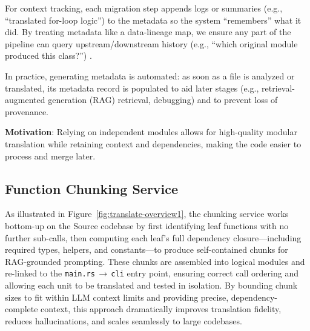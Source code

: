 \documentclass[twocolumn]{article}
\begin{document}
For context tracking, each migration step appends logs or summaries (e.g., ``translated for-loop logic'') to the metadata so the system ``remembers'' what it did. By treating metadata like a data-lineage map, we ensure any part of the pipeline can query upstream/downstream history (e.g., ``which original module produced this class?'') \cite{hu2024memserve} \cite{yao2024cacheblend}.

In practice, generating metadata is automated: as soon as a file is analyzed or translated, its metadata record is populated to aid later stages (e.g., retrieval-augmented generation (RAG) retrieval, debugging) and to prevent loss of provenance.

\textbf{Motivation}: Relying on independent modules allows for high-quality modular translation while retaining context and dependencies, making the code easier to process and merge later.

\subsection{Function Chunking Service}
\label{subsec:function_chunking}

As illustrated in Figure~\ref{fig:translate-overview1}, the chunking service works bottom-up on the Source codebase by first identifying leaf functions with no further sub-calls, then computing each leaf’s full dependency closure—including required types, helpers, and constants—to produce self-contained chunks for RAG-grounded prompting. These chunks are assembled into logical modules and re-linked to the \texttt{main.rs}\,$\to$\,\texttt{cli} entry point, ensuring correct call ordering and allowing each unit to be translated and tested in isolation. By bounding chunk sizes to fit within LLM context limits and providing precise, dependency-complete context, this approach dramatically improves translation fidelity, reduces hallucinations, and scales seamlessly to large codebases.
\end{document}
